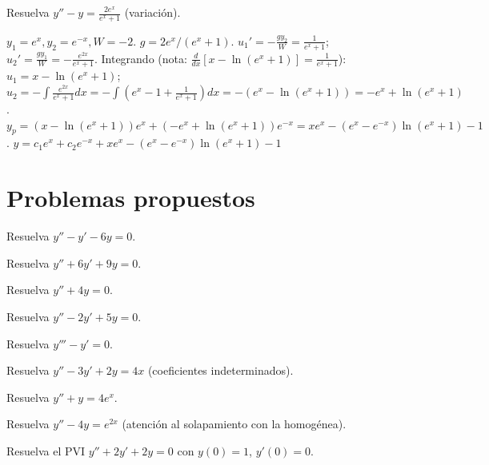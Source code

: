 \begin{prob}
Resuelva $y'' - y = \frac{2e^x}{e^x+1}$ (variación).
\begin{myproof}
$y_1=e^x, y_2=e^{-x}, W=-2$. $g=2e^x/(e^x+1)$. $u_1'=-\frac{g y_2}{W}=\frac{1}{e^x+1}$; $u_2'=\frac{g y_1}{W}=-\frac{e^{2x}}{e^x+1}$. Integrando (nota: $\frac{d}{dx}[x-\ln(e^x+1)]=\frac{1}{e^x+1}$): $u_1=x-\ln(e^x+1)$; $u_2=-\int\frac{e^{2x}}{e^x+1}dx=-\int\!\left(e^x-1+\frac{1}{e^x+1}\right)dx=-(e^x-\ln(e^x+1))=-e^x+\ln(e^x+1)$. $y_p=(x-\ln(e^x+1))e^x+(-e^x+\ln(e^x+1))e^{-x}=xe^x-(e^x-e^{-x})\ln(e^x+1)-1$. $\boxed{y=c_1e^x+c_2e^{-x}+xe^x-(e^x-e^{-x})\ln(e^x+1)-1}$
\end{myproof}
\end{prob}

\section{Problemas propuestos}

\begin{prob}
Resuelva $y'' - y' - 6y = 0$.
\end{prob}

\begin{prob}
Resuelva $y'' + 6y' + 9y = 0$.
\end{prob}

\begin{prob}
Resuelva $y'' + 4y = 0$.
\end{prob}

\begin{prob}
Resuelva $y'' - 2y' + 5y = 0$.
\end{prob}

\begin{prob}
Resuelva $y''' - y' = 0$.
\end{prob}

\begin{prob}
Resuelva $y'' - 3y' + 2y = 4x$ (coeficientes indeterminados).
\end{prob}

\begin{prob}
Resuelva $y'' + y = 4e^x$.
\end{prob}

\begin{prob}
Resuelva $y'' - 4y = e^{2x}$ (atención al solapamiento con la homogénea).
\end{prob}

\begin{prob}
Resuelva el PVI $y'' + 2y' + 2y = 0$ con $y(0)=1$, $y'(0)=0$.
\end{prob}

